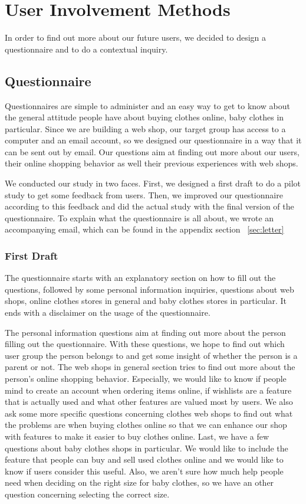 \section{User Involvement Methods}
In order to find out more about our future users, we decided to design a questionnaire and to do a contextual inquiry. 

\subsection{Questionnaire}
Questionnaires are simple to administer and an easy way to get to know about the general attitude people have about buying clothes online, baby clothes in particular. Since we are building a web shop, our target group has access to a computer and an email account, so we designed our questionnaire in a way that it can be sent out by email. Our questions aim at finding out more about our users, their online shopping behavior as well their previous experiences with web shops. 

We conducted our study in two faces. First, we designed a first draft to do a pilot study to get some feedback from users. Then, we improved our questionnaire according to this feedback and did the actual study with the final version of the questionnaire. To explain what the questionnaire is all about, we wrote an accompanying email, which can be found in the appendix section ~\ref{sec:letter}

\subsubsection{First Draft}
The questionnaire starts with an explanatory section on how to fill out the questions, followed by some personal information inquiries, questions about web shops, online clothes stores in general and baby clothes stores in particular. It ends with a disclaimer on the usage of the questionnaire.

The personal information questions aim at finding out more about the person filling out the questionnaire. With these questions, we hope to find out which user group the person belongs to and get some insight of whether the person is a parent or not. The web shops in general section tries to find out more about the person's online shopping behavior. Especially, we would like to know if people mind to create an account when ordering items online, if wishlists are a feature that is actually used and what other features are valued most by users.
We also ask some more specific questions concerning clothes web shops to find out what the problems are when buying clothes online so that we can enhance our shop with features to make it easier to buy clothes online. 
Last, we have a few questions about baby clothes shops in particular. We would like to include the feature that people can buy and sell used clothes online and we would like to know if users consider this useful. Also, we aren't sure how much help people need when deciding on the right size for baby clothes, so we have an other question concerning selecting the correct size.

